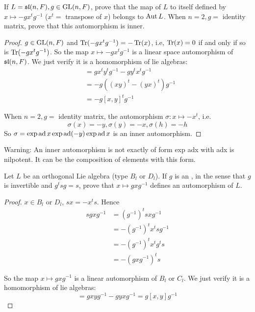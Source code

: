 \begin{ex}
  If $L = \sl(n, F), g \in \GL(n, F)$, prove that the map of $L$ to itself defined by $x \mapsto -gx^tg^{-1}$ ($x^t=$ transpose of $x$) belongs to $\Aut L$. When $n = 2, g =$ identity matrix, prove that this automorphism is inner.
\end{ex}
\begin{proof}
  $g\in \GL(n, F)$ and $\Tr(-gx^tg^{-1}) = -\Tr(x)$, i.e, $\Tr(x) = 0$ if and only if so is $\Tr(-gx^tg^{-1})$. So the map $x \mapsto -gx^tg^{-1}$ is a linear space automorphism of $\sl(n, F)$. We just verify it is a homomorphism of lie algebras:
  \begin{align*}
    [-gx^tg^{-1},-gy^tg^{-1}] &= gx^ty^tg^{-1} -gy^tx^tg^{-1} \\
    &= -g((xy)^t - (yx)^t)g^{-1} \\
    &= -g[x, y]^tg^{-1}
  \end{align*}

  When $n = 2, g=$ identity matrix, the automorphism $\sigma\colon
  x \mapsto -x^t$, i.e.
  \begin{equation*}
   \sigma(x) = -y, \sigma(y) = -x, \sigma(h) = -h
  \end{equation*}
  So $\sigma = \exp \ad x \exp \ad(-y) \exp \ad x$ is an inner automorphism.
\end{proof}
\begin{rem}
  Warning: An inner automorphism is not exactly of form exp adx with adx is nilpotent. It can be the composition of elements with this form.
\end{rem}

\begin{ex}
  Let $L$ be an orthogonal Lie algebra (type $B_l$ or $D_l$). If $g$ is an , in the sense that $g$ is invertible and $g^tsg = s$, prove that $x \mapsto gxg^{-1}$ defines an automorphism of $L$.
\end{ex}
\begin{proof}
  $x \in B_l$ or $D_l$, $sx = -x^ts$. Hence
  \begin{align*}
    sgxg^{-1} &= (g^{-1})^tsxg^{-1} \\
        &= -(g^{-1})^tx^tsg^{-1} \\
        &= -(g^{-1})^tx^tg^ts \\
        &= -(gxg^{-1})^ts
  \end{align*}

  So the map $x \mapsto gxg^{-1}$ is a linear automorphism of $B_l$ or $C_l$. We just verify it is a homomorphism of lie algebras:
  \begin{equation*}
    [gxg^{-1}, gyg^{-1}] = gxyg^{-1} - gyxg^{-1} = g[x, y]g^{-1}
  \end{equation*}
\end{proof}

